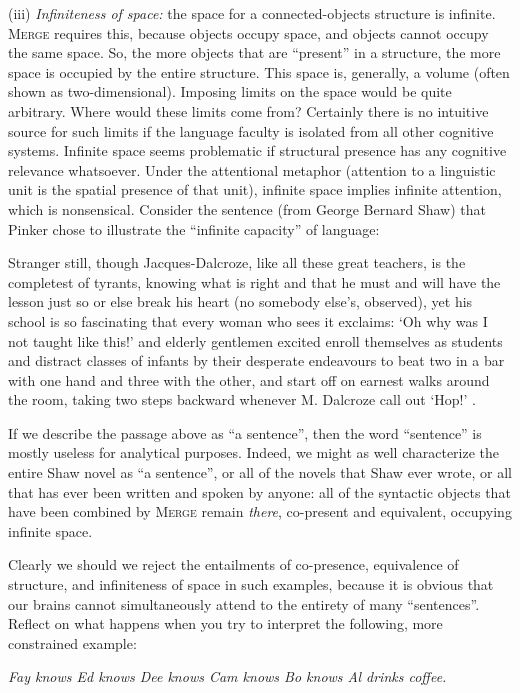 (iii) \textit{Infiniteness of space:} the space for a connected-objects structure is infinite. \textsc{Merge} requires this, because objects occupy space, and objects cannot occupy the same space. So, the more objects that are “present” in a structure, the more space is occupied by the entire structure. This space is, generally, a volume (often shown as two-dimensional). Imposing limits on the space would be quite arbitrary. Where would these limits come from? Certainly there is no intuitive source for such limits if the language faculty is isolated from all other cognitive systems. Infinite space seems problematic if structural presence has any cognitive relevance whatsoever. Under the attentional metaphor (attention to a linguistic unit is the spatial presence of that unit), infinite space implies infinite attention, which is nonsensical. Consider the sentence (from George Bernard Shaw) that Pinker chose to illustrate the “infinite capacity” of language:

Stranger still, though Jacques-Dalcroze, like all these great teachers, is the completest of tyrants, knowing what is right and that he must and will have the lesson just so or else break his heart (no somebody else’s, observed), yet his school is so fascinating that every woman who sees it exclaims: ‘Oh why was I not taught like this!’ and elderly gentlemen excited enroll themselves as students and distract classes of infants by their desperate endeavours to beat two in a bar with one hand and three with the other, and start off on earnest walks around the room, taking two steps backward whenever M. Dalcroze call out ‘Hop!’ \citep{Pinker2003}.

  If we describe the passage above as “a sentence”, then the word “sentence” is mostly useless for analytical purposes. Indeed, we might as well characterize the entire Shaw novel as “a sentence”, or all of the novels that Shaw ever wrote, or all that has ever been written and spoken by anyone: all of the syntactic objects that have been combined by \textsc{Merge} remain \textit{there}, co-present and equivalent, occupying infinite space. 

  Clearly we should we reject the entailments of co-presence, equivalence of structure, and infiniteness of space in such examples, because it is obvious that our brains cannot simultaneously attend to the entirety of many “sentences”. Reflect on what happens when you try to interpret the following, more constrained example:

    \textit{Fay knows Ed knows Dee knows Cam knows Bo knows Al drinks coffee.}

